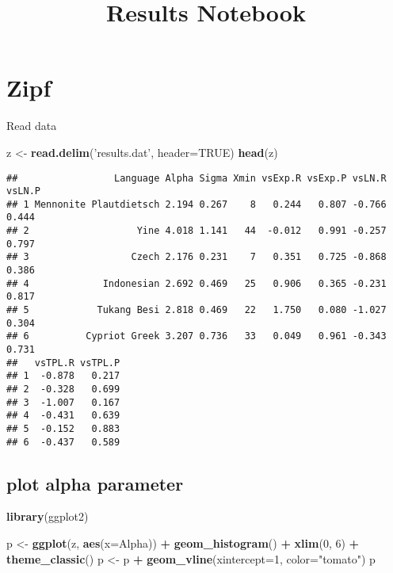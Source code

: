 \documentclass[]{article}
\title{Results Notebook}
\author{}
\date{}
\newenvironment{Shaded}{\begin{snugshade}}{\end{snugshade}}
\newcommand{\DataTypeTok}[1]{\textcolor[rgb]{0.13,0.29,0.53}{#1}}
\newcommand{\DecValTok}[1]{\textcolor[rgb]{0.00,0.00,0.81}{#1}}
\newcommand{\KeywordTok}[1]{\textcolor[rgb]{0.13,0.29,0.53}{\textbf{#1}}}
\newcommand{\NormalTok}[1]{#1}
\newcommand{\OperatorTok}[1]{\textcolor[rgb]{0.81,0.36,0.00}{\textbf{#1}}}
\newcommand{\OtherTok}[1]{\textcolor[rgb]{0.56,0.35,0.01}{#1}}
\newcommand{\StringTok}[1]{\textcolor[rgb]{0.31,0.60,0.02}{#1}}
\begin{document}
\maketitle

\hypertarget{zipf}{%
\section{Zipf}\label{zipf}}

Read data

\begin{Shaded}
\begin{Highlighting}[]
\NormalTok{z <-}\StringTok{ }\KeywordTok{read.delim}\NormalTok{(}\StringTok{'results.dat'}\NormalTok{, }\DataTypeTok{header=}\OtherTok{TRUE}\NormalTok{)}
\KeywordTok{head}\NormalTok{(z)}
\end{Highlighting}
\end{Shaded}

\begin{verbatim}
##                 Language Alpha Sigma Xmin vsExp.R vsExp.P vsLN.R vsLN.P
## 1 Mennonite Plautdietsch 2.194 0.267    8   0.244   0.807 -0.766  0.444
## 2                   Yine 4.018 1.141   44  -0.012   0.991 -0.257  0.797
## 3                  Czech 2.176 0.231    7   0.351   0.725 -0.868  0.386
## 4             Indonesian 2.692 0.469   25   0.906   0.365 -0.231  0.817
## 5            Tukang Besi 2.818 0.469   22   1.750   0.080 -1.027  0.304
## 6          Cypriot Greek 3.207 0.736   33   0.049   0.961 -0.343  0.731
##   vsTPL.R vsTPL.P
## 1  -0.878   0.217
## 2  -0.328   0.699
## 3  -1.007   0.167
## 4  -0.431   0.639
## 5  -0.152   0.883
## 6  -0.437   0.589
\end{verbatim}

\hypertarget{plot-alpha-parameter}{%
\subsection{plot alpha parameter}\label{plot-alpha-parameter}}

\begin{Shaded}
\begin{Highlighting}[]
\KeywordTok{library}\NormalTok{(ggplot2)}

\NormalTok{p <-}\StringTok{ }\KeywordTok{ggplot}\NormalTok{(z, }\KeywordTok{aes}\NormalTok{(}\DataTypeTok{x=}\NormalTok{Alpha)) }\OperatorTok{+}\StringTok{ }\KeywordTok{geom_histogram}\NormalTok{() }\OperatorTok{+}\StringTok{ }\KeywordTok{xlim}\NormalTok{(}\DecValTok{0}\NormalTok{, }\DecValTok{6}\NormalTok{) }\OperatorTok{+}\StringTok{ }\KeywordTok{theme_classic}\NormalTok{()}
\NormalTok{p <-}\StringTok{ }\NormalTok{p }\OperatorTok{+}\StringTok{ }\KeywordTok{geom_vline}\NormalTok{(}\DataTypeTok{xintercept=}\DecValTok{1}\NormalTok{, }\DataTypeTok{color=}\StringTok{"tomato"}\NormalTok{)}
\NormalTok{p}
\end{Highlighting}
\end{Shaded}
\end{document}
